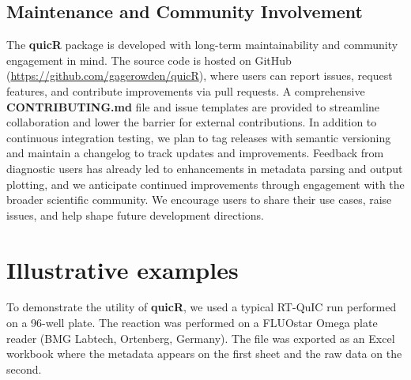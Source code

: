 \documentclass[preprint,12pt,a4paper]{elsarticle}
\begin{document}
        \subsection{Maintenance and Community Involvement}
            The \textbf{quicR} package is developed with long-term maintainability and community engagement in mind. The source code is hosted on GitHub (\url{https://github.com/gagerowden/quicR}), where users can report issues, request features, and contribute improvements via pull requests. A comprehensive \textbf{CONTRIBUTING.md} file and issue templates are provided to streamline collaboration and lower the barrier for external contributions. In addition to continuous integration testing, we plan to tag releases with semantic versioning and maintain a changelog to track updates and improvements. Feedback from diagnostic users has already led to enhancements in metadata parsing and output plotting, and we anticipate continued improvements through engagement with the broader scientific community. We encourage users to share their use cases, raise issues, and help shape future development directions.

    \section{Illustrative examples}
        To demonstrate the utility of \textbf{quicR}, we used a typical RT-QuIC run performed on a 96-well plate. The reaction was performed on a FLUOstar Omega plate reader (BMG Labtech, Ortenberg, Germany). The file was exported as an Excel workbook where the metadata appears on the first sheet and the raw data on the second.
        
\end{document}
